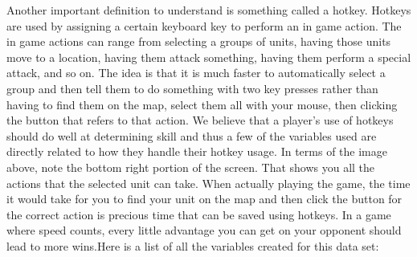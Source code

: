 \documentclass[letterpaper,10pt,english]{/usr/share/sphinx/texinputs/sphinxhowto}
\begin{document}
        
    
Another important definition to understand is something called a hotkey.
Hotkeys are used by assigning a certain keyboard key to perform an in
game action. The in game actions can range from selecting a groups of
units, having those units move to a location, having them attack
something, having them perform a special attack, and so on. The idea is
that it is much faster to automatically select a group and then tell
them to do something with two key presses rather than having to find
them on the map, select them all with your mouse, then clicking the
button that refers to that action. We believe that a player's use of
hotkeys should do well at determining skill and thus a few of the
variables used are directly related to how they handle their hotkey
usage. In terms of the image above, note the bottom right portion of the
screen. That shows you all the actions that the selected unit can take.
When actually playing the game, the time it would take for you to find
your unit on the map and then click the button for the correct action is
precious time that can be saved using hotkeys. In a game where speed
counts, every little advantage you can get on your opponent should lead
to more wins.Here is a list of all the variables created for this data set:
\end{document}
